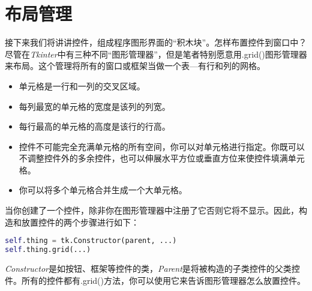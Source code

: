 \chapter[布局管理]{布局管理}
接下来我们将讲讲控件，组成程序图形界面的“积木块”。怎样布置控件到窗口中？
尽管在\textit{Tkinter}中有三种不同“图形管理器”，但是笔者特别愿意用.grid()图形管理器来布局。这个管理将所有的窗口或框架当做一个表---有行和列的网格。
\begin{itemize}
\item
单元格是一行和一列的交叉区域。
\item
每列最宽的单元格的宽度是该列的列宽。
\item
每行最高的单元格的高度是该行的行高。
\item
控件不可能完全充满单元格的所有空间，你可以对单元格进行指定。你既可以不调整控件外的多余控件，也可以伸展水平方位或垂直方位来使控件填满单元格。
\item
你可以将多个单元格合并生成一个大单元格。
\end{itemize}
当你创建了一个控件，除非你在图形管理器中注册了它否则它将不显示。因此，构造和放置控件的两个步骤进行如下：
\begin{lstlisting}[language=python]
self.thing = tk.Constructor(parent, ...)
self.thing.grid(...)
\end{lstlisting}
\textit{Constructor}是如按钮、框架等控件的类，\textit{Parent}是将被构造的子类控件的父类控件。所有的控件都有.grid()方法，你可以使用它来告诉图形管理器怎么放置控件。

